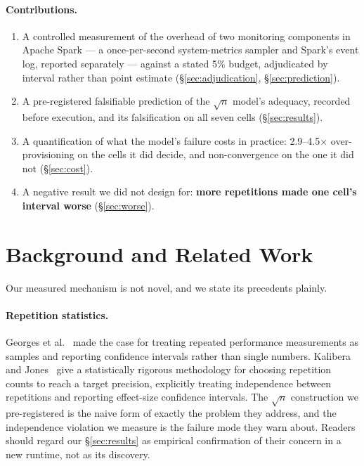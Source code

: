 \documentclass[sigconf,review,anonymous]{acmart}
\begin{document}
\paragraph{Contributions.}
\begin{enumerate}
\item A controlled measurement of the overhead of two monitoring components in Apache Spark --- a
  once-per-second system-metrics sampler and Spark's event log, reported separately --- against a
  stated 5\% budget, adjudicated by interval rather than point estimate (\S\ref{sec:adjudication}, \S\ref{sec:prediction}).
\item A pre-registered falsifiable prediction of the $\sqrt{n}$ model's adequacy, recorded before
  execution, and its falsification on all seven cells (\S\ref{sec:results}).
\item A quantification of what the model's failure costs in practice: 2.9--4.5× over-provisioning on
  the cells it did decide, and non-convergence on the one it did not (\S\ref{sec:cost}).
\item A negative result we did not design for: \textbf{more repetitions made one cell's interval worse}
  (\S\ref{sec:worse}).
\end{enumerate}

\section{Background and Related Work}

Our measured mechanism is not novel, and we state its precedents plainly.

\paragraph{Repetition statistics.} Georges et al.~\cite{georges2007statistically} made the case for
treating repeated performance measurements as samples and reporting confidence intervals rather
than single numbers. Kalibera and Jones~\cite{kalibera2013rigorous} give a statistically rigorous
methodology for choosing repetition counts to reach a target precision, explicitly treating
independence between repetitions and reporting effect-size confidence intervals. The $\sqrt{n}$
construction we pre-registered is the naive form of exactly the problem they address, and the
independence violation we measure is the failure mode they warn about. Readers should regard our
\S\ref{sec:results} as empirical confirmation of their concern in a new runtime, not as its discovery.
\end{document}
